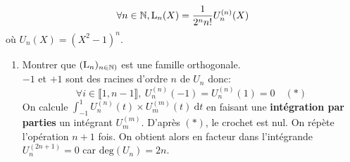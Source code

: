 $$\forall n \in \mathbb{N}, \mathrm{L}_n(X) = \frac{1}{2^n n!} U_n^{(n)}(X)$$
où $U_n(X) = (X^2-1)^n$.

\begin{enumerate}
    \item Montrer que $(\mathrm{L}_n)_{n \in \mathbb{N})}$ est une famille orthogonale. \\
    $-1$ et $+1$ sont des racines d'ordre $n$ de $U_n$ donc:
    $$\forall i \in \llbracket 1, n-1 \rrbracket,\ U_n^{(n)}(-1) = U_n^{(n)}(1) = 0 \quad (*)$$
    On calcule $\int_{-1}^{1} U_n^{(n)}(t) \times U_m^{(m)}(t)\ \mathrm{d}t$ en faisant une \textbf{intégration par parties} un intégrant $U_m^{(m)}$. D'après $(*)$, le crochet est nul. On répète l'opération $n+1$ fois. On obtient alors en facteur dans l'intégrande $U_n^{(2n+1)} = 0$ car $\mathrm{deg}(U_n) = 2n$.
\end{enumerate}
